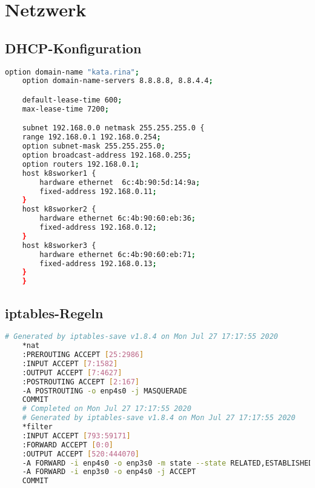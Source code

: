 \chapter{Netzwerk}

\section{DHCP-Konfiguration}
\label{app:dhcp}
\begin{lstlisting}[language=bash, caption={dhcp configuration}]
    option domain-name "kata.rina";
    option domain-name-servers 8.8.8.8, 8.8.4.4;

    default-lease-time 600;
    max-lease-time 7200;

    subnet 192.168.0.0 netmask 255.255.255.0 {
    range 192.168.0.1 192.168.0.254;
    option subnet-mask 255.255.255.0;
    option broadcast-address 192.168.0.255;
    option routers 192.168.0.1;
    host k8sworker1 {
        hardware ethernet  6c:4b:90:5d:14:9a;
        fixed-address 192.168.0.11;
    }
    host k8sworker2 {
        hardware ethernet 6c:4b:90:60:eb:36; 
        fixed-address 192.168.0.12;
    }
    host k8sworker3 {
        hardware ethernet 6c:4b:90:60:eb:71;
        fixed-address 192.168.0.13;
    }
    }
\end{lstlisting}
\newpage

\section{iptables-Regeln}
\label{app:iptables}
\begin{lstlisting}[language=bash, caption={iptables rules}]
    # Generated by iptables-save v1.8.4 on Mon Jul 27 17:17:55 2020
    *nat
    :PREROUTING ACCEPT [25:2986]
    :INPUT ACCEPT [7:1582]
    :OUTPUT ACCEPT [7:4627]
    :POSTROUTING ACCEPT [2:167]
    -A POSTROUTING -o enp4s0 -j MASQUERADE
    COMMIT
    # Completed on Mon Jul 27 17:17:55 2020
    # Generated by iptables-save v1.8.4 on Mon Jul 27 17:17:55 2020
    *filter
    :INPUT ACCEPT [793:59171]
    :FORWARD ACCEPT [0:0]
    :OUTPUT ACCEPT [520:444070]
    -A FORWARD -i enp4s0 -o enp3s0 -m state --state RELATED,ESTABLISHED -j ACCEPT
    -A FORWARD -i enp3s0 -o enp4s0 -j ACCEPT
    COMMIT
\end{lstlisting}